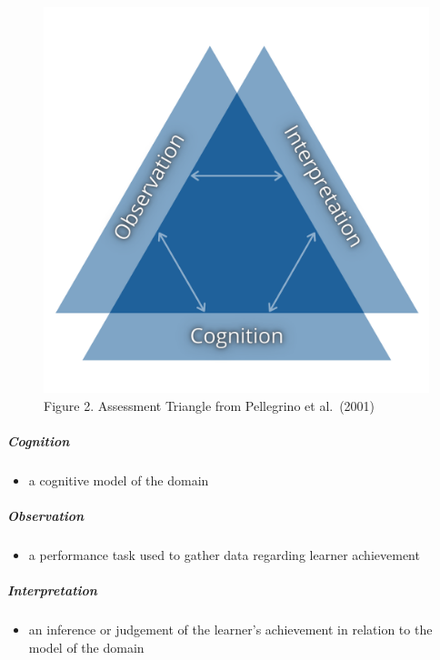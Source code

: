 \documentclass[
]{book}
\providecommand{\tightlist}{%
  \setlength{\itemsep}{0pt}\setlength{\parskip}{0pt}}
\begin{document}
\begin{figure}
\centering
\includegraphics{assets/otessa22/assessment-triangle.png}
\caption{Figure 2. Assessment Triangle from Pellegrino et al.~(2001)}
\end{figure}

\hypertarget{cognition}{%
\subparagraph*{Cognition}\label{cognition}}

\begin{itemize}
\tightlist
\item
  a cognitive model of the domain
\end{itemize}

\hypertarget{observation}{%
\subparagraph*{Observation}\label{observation}}

\begin{itemize}
\tightlist
\item
  a performance task used to gather data regarding learner achievement
\end{itemize}

\hypertarget{interpretation}{%
\subparagraph*{Interpretation}\label{interpretation}}

\begin{itemize}
\tightlist
\item
  an inference or judgement of the learner's achievement in relation to the model of the domain
\end{itemize}
\end{document}
